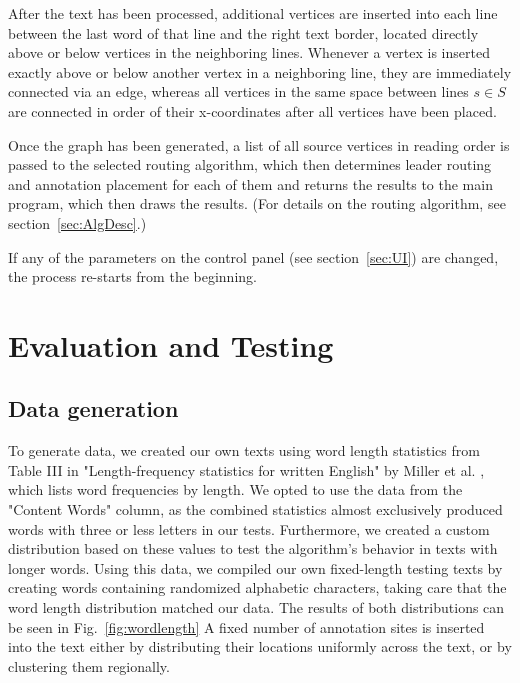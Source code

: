\documentclass[11pt,a4paper]{vutinfth}
\begin{document}
After the text has been processed, additional vertices are inserted into each line between the last word of that line and the right text border, located directly above or below vertices in the neighboring lines. Whenever a vertex is inserted exactly above or below another vertex in a neighboring line, they are immediately connected via an edge, whereas all vertices in the same space between lines $s \in S$ are connected in order of their x-coordinates after all vertices have been placed.

Once the graph has been generated, a list of all source vertices in reading order is passed to the selected routing algorithm, which then determines leader routing and annotation placement for each of them and returns the results to the main program, which then draws the results. (For details on the routing algorithm, see section~\ref*{sec:AlgDesc}.)

If any of the parameters on the control panel (see section~\ref*{sec:UI}) are changed, the process re-starts from the beginning.



\chapter{Evaluation and Testing}

\section{Data generation} 

To generate data, we created our own texts using word length statistics from Table III in "Length-frequency statistics for written English" by Miller et al. \cite{Miller1958}, which lists word frequencies by length. We opted to use the data from the "Content Words" column, as the combined statistics almost exclusively produced words with three or less letters in our tests. Furthermore, we created a custom distribution based on these values to test the algorithm's behavior in texts with longer words.
Using this data, we compiled our own fixed-length testing texts by creating words containing randomized alphabetic characters, taking care that the word length distribution matched our data. The results of both distributions can be seen in Fig.~\ref{fig:wordlength}
A fixed number of annotation sites is inserted into the text either by distributing their locations uniformly across the text, or by clustering them regionally. 
	
\end{document}
